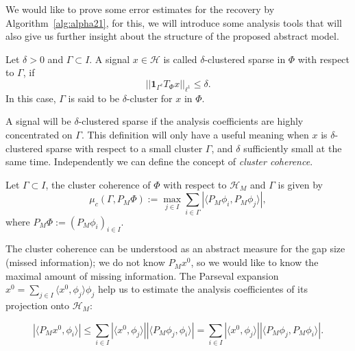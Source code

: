 \bigskip

We would like to prove some error estimates for the recovery by Algorithm~\ref{alg:alpha21}, for this, we will introduce some analysis tools that will also give us further insight about the structure of the proposed abstract model.

\bigskip

\begin{defn}
\label{def:alpha22}
Let $\delta>0$ and $\Gamma\subset I$. A signal $x\in\mathcal{H}$ is called $\delta$-clustered sparse in $\Phi$ with respect to $\Gamma$, if
\begin{equation}
\label{eq:alpha22}
||\mathbf{1}_{\Gamma^c}T_{\Phi}x||_{\ell^1}\leq \delta.
\end{equation}
In this case, $\Gamma$ is said to be $\delta$-cluster for $x$ in $\Phi$. 
\end{defn}

\bigskip

A signal will be $\delta$-clustered sparse if the analysis coefficients are highly concentrated on $\Gamma$. This definition will only have a useful meaning when $x$ is $\delta$-clustered sparse with respect to a small cluster $\Gamma$, and $\delta$ sufficiently small at the same time. Independently we can define the concept of \textit{cluster coherence}.

\bigskip

\begin{defn}
Let $\Gamma\subset I$, the cluster coherence of $\Phi$ with respect to $\mathcal{H}_M$ and $\Gamma$ is given by 
$$
\mu_c(\Gamma,P_M\Phi):=\max_{j\in I}\sum_{i\in\Gamma}|\langle P_M\phi_i,P_M\phi_j\rangle|,
$$
where $P_M\Phi:=(P_M\phi_i)_{i\in I}$.
\end{defn}

\bigskip

The cluster coherence can be understood as an abstract measure for the gap size (missed information); we do not know $P_Mx^0$, so we would like to know the maximal amount of missing information. The Parseval expansion $x^0=\sum_{j\in I}\langle x^0,\phi_j\rangle \phi_j$ help us to estimate the analysis coefficientes of its projection onto $\mathcal{H}_M$:

\begin{equation}
\label{eq:alpha23}
|\langle P_Mx^0,\phi_i\rangle|\leq\sum_{i\in I}|\langle x^0,\phi_j\rangle||\langle P_M\phi_j,\phi_i\rangle|=\sum_{i\in I}|\langle x^0,\phi_j\rangle||\langle P_M\phi_j, P_M\phi_i\rangle|.
\end{equation}

